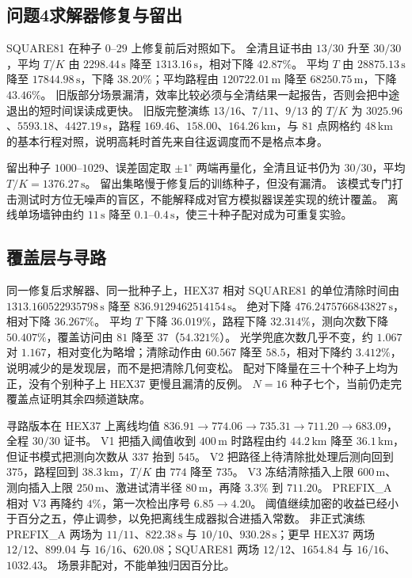 \subsection{问题4求解器修复与留出}

SQUARE81 在种子 $0$--$29$ 上修复前后对照如下。
全清且证书由 $13/30$ 升至 $30/30$，平均 $T/K$ 由 $2298.44\,\mathrm{s}$ 降至 $1313.16\,\mathrm{s}$，相对下降 $42.87\%$。
平均 $T$ 由 $28875.13\,\mathrm{s}$ 降至 $17844.98\,\mathrm{s}$，下降 $38.20\%$；平均路程由 $120722.01\,\mathrm{m}$ 降至 $68250.75\,\mathrm{m}$，下降 $43.46\%$。
旧版部分场景漏清，效率比较必须与全清结果一起报告，否则会把中途退出的短时间误读成更快。
旧版完整演练 $13/16$、$7/11$、$9/13$ 的 $T/K$ 为 $3025.96$、$5593.18$、$4427.19\,\mathrm{s}$，路程 $169.46$、$158.00$、$164.26\,\mathrm{km}$，与 $81$ 点网格约 $48\,\mathrm{km}$ 的基本行程对照，说明高耗时首先来自往返调度而不是格点本身。

留出种子 $1000$--$1029$、误差固定取 $\pm 1^\circ$ 两端再量化，全清且证书仍为 $30/30$，平均 $T/K=1376.27\,\mathrm{s}$。
留出集略慢于修复后的训练种子，但没有漏清。
该模式专门打击测试时方位无噪声的盲区，不能解释成对官方模拟器误差实现的统计覆盖。
离线单场墙钟由约 $11\,\mathrm{s}$ 降至 $0.1$--$0.4\,\mathrm{s}$，使三十种子配对成为可重复实验。

\subsection{覆盖层与寻路}

同一修复后求解器、同一批种子上，HEX37 相对 SQUARE81 的单位清除时间由 $1313.160522935798\,\mathrm{s}$ 降至 $836.9129462514154\,\mathrm{s}$。
绝对下降 $476.2475766843827\,\mathrm{s}$，相对下降 $36.267\%$。
平均 $T$ 下降 $36.019\%$，路程下降 $32.314\%$，测向次数下降 $50.407\%$，覆盖访问由 $81$ 降至 $37$（$54.321\%$）。
光学兜底次数几乎不变，约 $1.067$ 对 $1.167$，相对变化为略增；清除动作由 $60.567$ 降至 $58.5$，相对下降约 $3.412\%$，说明减少的是发现层，而不是把清除几何变松。
配对下降量在三十个种子上均为正，没有个别种子上 HEX37 更慢且漏清的反例。
$N=16$ 种子七个，当前仍走完覆盖点证明其余四频道缺席。

寻路版本在 HEX37 上离线均值 $836.91\to 774.06\to 735.31\to 711.20\to 683.09$，全程 $30/30$ 证书。
V1 把插入阈值收到 $400\,\mathrm{m}$ 时路程由约 $44.2\,\mathrm{km}$ 降至 $36.1\,\mathrm{km}$，但证书模式把测向次数从 $337$ 抬到 $545$。
V2 把路径上待清除批处理后测向回到 $375$，路程回到 $38.3\,\mathrm{km}$，$T/K$ 由 $774$ 降至 $735$。
V3 冻结清除插入上限 $600\,\mathrm{m}$、测向插入上限 $250\,\mathrm{m}$、激进试清半径 $80\,\mathrm{m}$，再降 $3.3\%$ 到 $711.20$。
PREFIX\_A 相对 V3 再降约 $4\%$，第一次检出序号 $6.85\to 4.20$。
阈值继续加密的收益已经小于百分之五，停止调参，以免把离线生成器拟合进插入常数。
非正式演练 PREFIX\_A 两场为 $11/11$、$822.38\,\mathrm{s}$ 与 $10/10$、$930.28\,\mathrm{s}$；更早 HEX37 两场 $12/12$、$899.04$ 与 $16/16$、$620.08$；SQUARE81 两场 $12/12$、$1654.84$ 与 $16/16$、$1032.43$。
场景非配对，不能单独归因百分比。

